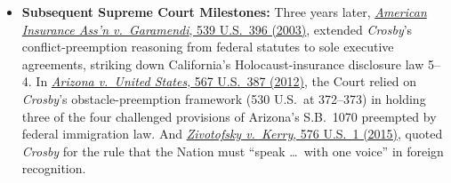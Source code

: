 \documentclass[12pt]{article}
\begin{document}
\begin{itemize}

\item \textbf{Subsequent Supreme Court Milestones:} Three years later, \href{https://supreme.justia.com/cases/federal/us/539/396/}{\textit{American Insurance Ass'n v.\ Garamendi}, 539 U.S.\ 396 (2003)}, extended \textit{Crosby}'s conflict-preemption reasoning from federal statutes to sole executive agreements, striking down California's Holocaust-insurance disclosure law 5--4. In \href{https://www.everycrsreport.com/reports/R42719.html}{\textit{Arizona v.\ United States}, 567 U.S.\ 387 (2012)}, the Court relied on \textit{Crosby}'s obstacle-preemption framework (530 U.S.\ at 372--373) in holding three of the four challenged provisions of Arizona's S.B.~1070 preempted by federal immigration law. And \href{https://supreme.justia.com/cases/federal/us/576/1/}{\textit{Zivotofsky v.\ Kerry}, 576 U.S.\ 1 (2015)}, quoted \textit{Crosby} for the rule that the Nation must ``speak \dots\ with one voice'' in foreign recognition.

\end{itemize}
\end{document}
